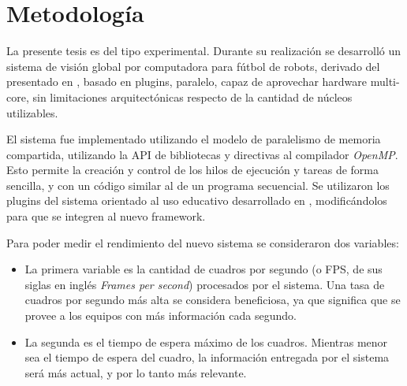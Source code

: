 
\section{Metodología}

\label{metodologia}

La presente tesis es del tipo experimental. Durante su realización se desarrolló
un sistema de visión global por computadora para fútbol de robots, derivado del
presentado en \cite{torres2014}, basado en plugins, paralelo, capaz de
aprovechar hardware multi-core, sin limitaciones arquitectónicas respecto de la
cantidad de núcleos utilizables.

El sistema fue implementado utilizando el modelo de paralelismo de memoria
compartida, utilizando la API de bibliotecas y directivas al compilador
\emph{OpenMP}. Esto permite la creación y control de los hilos de ejecución y
tareas de forma sencilla, y con un código similar al de un programa secuencial.
Se utilizaron los plugins del sistema orientado al uso educativo desarrollado en
\cite{torres2014}, modificándolos para que se integren al nuevo framework.

Para poder medir el rendimiento del nuevo sistema se consideraron dos variables:

\begin {itemize}

	\item	La primera variable es la cantidad de cuadros por segundo (o
		FPS, de sus siglas en inglés \emph{Frames per second})
		procesados por el sistema. Una tasa de cuadros por segundo más
		alta se considera beneficiosa, ya que significa que se provee a
		los equipos con más información cada segundo.

	\item	La segunda es el tiempo de espera máximo de los cuadros.
		Mientras menor sea el tiempo de espera del cuadro, la
		información entregada por el sistema será más actual, y por lo
		tanto más relevante.

\end {itemize}
